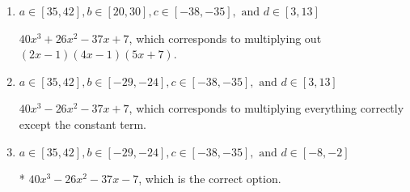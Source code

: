 \documentclass{extbook}[14pt]
\begin{document}
\begin{enumerate}
{\begin{enumerate}[label=\Alph*.]
$40x^{3} -66 x^{2} +9 x + 7$, which corresponds to multiplying out $(2x -1)(4x + 1)(5x -7)$.
\item \( a \in [35, 42], b \in [20, 30], c \in [-38, -35], \text{ and } d \in [3, 13] \)

$40x^{3} +26 x^{2} -37 x + 7$, which corresponds to multiplying out $(2x -1)(4x -1)(5x + 7)$.
\item \( a \in [35, 42], b \in [-29, -24], c \in [-38, -35], \text{ and } d \in [3, 13] \)

$40x^{3} -26 x^{2} -37 x + 7$, which corresponds to multiplying everything correctly except the constant term.
\item \( a \in [35, 42], b \in [-29, -24], c \in [-38, -35], \text{ and } d \in [-8, -2] \)

* $40x^{3} -26 x^{2} -37 x -7$, which is the correct option.
\end{enumerate}

}
\end{enumerate}
\end{document}
